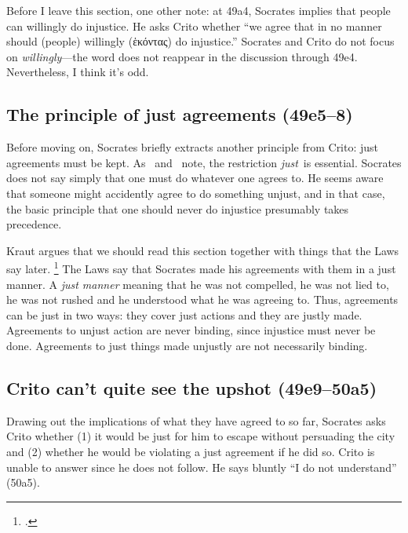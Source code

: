 \documentclass[12pt,letterpaper]{article}
\begin{document}
Before I leave this section, one other note: at 49a4, Socrates implies that people can willingly do injustice.
He asks Crito whether ``we agree that in no manner should (people) willingly (\textgreek{ἑκόντας}) do injustice.''
Socrates and Crito do not focus on \textit{willingly}---the word does not reappear in the discussion through 49e4.
Nevertheless, I think it's odd.

\subsection*{The principle of just agreements (49e5--8)}

Before moving on, Socrates briefly extracts another principle from Crito: just agreements must be kept.
As~\cite{kraut-socrates-state-1984} and~\cite{brickhouse-smith2004-plato-trial-of-socrates} note, the restriction \emph{just}~is essential.
Socrates does not say simply that one must do whatever one agrees to.
He seems aware that someone might accidently agree to do something unjust, and in that case, the basic principle that one should never do injustice presumably takes precedence.

Kraut argues that we should read this section together with things that the Laws say later.%
\footcite[][32]{kraut-socrates-state-1984}
The Laws say that Socrates made his agreements with them in a just manner.
A \emph{just manner} meaning that he was not compelled, he was not lied to, he was not rushed and he understood what he was agreeing to.
Thus, agreements can be just in two ways: they cover just actions and they are justly made.
Agreements to unjust action are never binding, since injustice must never be done.
Agreements to just things made unjustly are not necessarily binding.

\subsection*{Crito can't quite see the upshot (49e9--50a5)}

Drawing out the implications of what they have agreed to so far, Socrates asks Crito whether (1) it would be just for him to escape without persuading the city and (2) whether he would be violating a just agreement if he did so.
Crito is unable to answer since he does not follow.
He says bluntly ``I do not understand'' (50a5).
\end{document}
